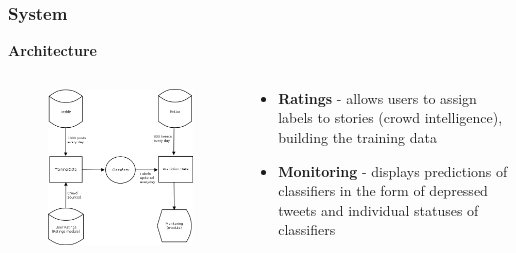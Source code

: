 \documentclass[xcolor=table]{beamer}
\begin{document}
    \begin{frame}
        \frametitle{System}
        \begin{center}
            \textbf{Architecture}
        \end{center}
        \begin{columns}
            \begin{column}{0.5\textwidth}
                \begin{figure}
                    \centering
                    \includegraphics[width=\textwidth]{figures/Architecture.png}
                \end{figure}
            \end{column}
            \begin{column}{0.5\textwidth}
                \begin{itemize}
                    \item{\textbf{Ratings} - allows users to assign labels to stories (crowd intelligence), building the training data}
                    \item{\textbf{Monitoring} - displays predictions of classifiers in the form of depressed tweets and individual statuses of classifiers}
                \end{itemize}
            \end{column}
        \end{columns}
    \end{frame}
    
\end{document}
